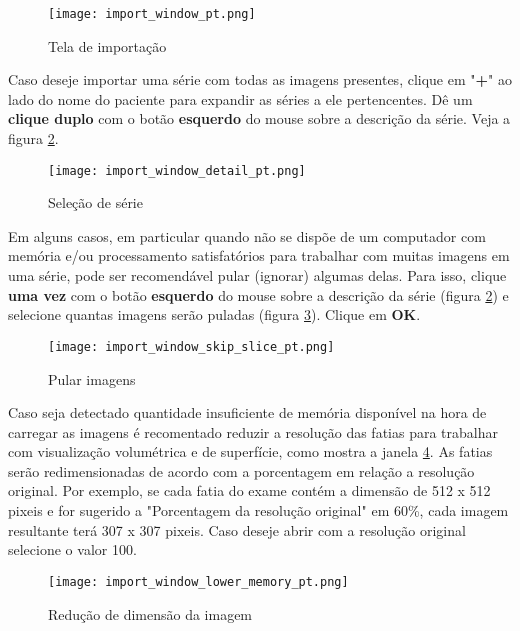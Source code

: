 \begin{figure}[!htb]
\centering
\texttt{[image: import\_window\_pt.png]}
\caption{Tela de importação}
\label{fig:win_import}
\end{figure}

\newpage

Caso deseje importar uma série com todas as imagens presentes, clique em "\textbf{+}" ao
lado do nome do paciente para expandir as séries a ele pertencentes. Dê um \textbf{clique duplo}
com o botão \textbf{esquerdo} do mouse sobre a descrição da série. Veja a figura
\ref{fig:import_serie}.

\begin{figure}[!htb]
\centering
\texttt{[image: import\_window\_detail\_pt.png]}
\caption{Seleção de série}
\label{fig:import_serie}
\end{figure}
 

Em alguns casos, em particular quando não se dispõe de um computador com memória e/ou
processamento satisfatórios para trabalhar com muitas imagens em uma série, pode ser
recomendável pular (ignorar) algumas delas. Para isso, clique \textbf{uma vez} com o botão
\textbf{esquerdo} do mouse sobre a descrição da série (figura \ref{fig:import_serie}) e selecione
quantas imagens serão puladas (figura \ref{fig:skip_image}). Clique em \textbf{OK}.

\begin{figure}[!htb]
\centering
\texttt{[image: import\_window\_skip\_slice\_pt.png]}
\caption{Pular imagens}
\label{fig:skip_image}
\end{figure}


Caso seja detectado quantidade insuficiente de memória disponível na hora de carregar as imagens é recomentado 
reduzir a resolução das fatias para trabalhar com visualização volumétrica e de superfície, como mostra a janela \ref{fig:resize_image}. 
As fatias serão redimensionadas de acordo com a porcentagem em relação a resolução original. Por exemplo, 
se cada fatia do exame contém a dimensão de 512 x 512 pixeis e for sugerido a "Porcentagem da resolução original" em 60\%, 
cada imagem resultante terá 307 x 307 pixeis. Caso deseje abrir com a resolução original selecione o valor 100.

\begin{figure}[!htb]
\centering
\texttt{[image: import\_window\_lower\_memory\_pt.png]}
\caption{Redução de dimensão da imagem}
\label{fig:resize_image}
\end{figure}

